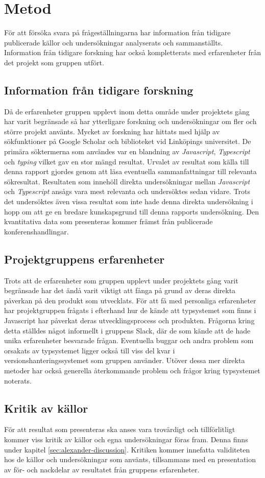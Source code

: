 \section{Metod}
\label{sec:alexander-method}

För att försöka svara på frågeställningarna har information från tidigare publicerade källor och undersökningar analyserats och sammanställts. Information från tidigare forskning har också kompletterats med erfarenheter från det projekt som gruppen utfört. 

\subsection{Information från tidigare forskning}

Då de erfarenheter gruppen upplevt inom detta område under projektets gång har varit begränsade så har ytterligare forskning och undersökningar om fler och större projekt använts. Mycket av forskning har hittats med hjälp av sökfunktioner på Google Scholar och biblioteket vid Linköpings universitet. De primära söktermerna som användes var en blandning av \textit{Javascript}, \textit{Typescript} och \textit{typing} vilket gav en stor mängd resultat. Urvalet av resultat som källa till denna rapport gjordes genom att läsa eventuella sammanfattningar till relevanta sökresultat. Resultaten som innehöll direkta undersökningar mellan \textit{Javascript} och \textit{Typescript} ansågs vara mest relevanta och undersöktes sedan vidare. Trots det undersöktes även vissa resultat som inte hade denna direkta undersökning i hopp om att ge en bredare kunskapsgrund till denna rapports undersökning. Den kvantitativa data som presenteras kommer främst från publicerade konferenshandlingar.

\subsection{Projektgruppens erfarenheter}
Trots att de erfarenheter som gruppen upplevt under projektets gång varit begränsade har det ändå varit viktigt att fånga på grund av deras direkta påverkan på den produkt som utvecklats. För att få med personliga erfarenheter har projektgruppen frågats i efterhand hur de kände att typsystemet som finns i Javascript har påverkat deras utvecklingsprocess och produkten. Frågorna kring detta ställdes något informellt i gruppens Slack, där de som kände att de hade unika erfarenheter besvarade frågan. Eventuella buggar och andra problem som orsakats av typsystemet ligger också till viss del kvar i versionshanteringssystemet som gruppen använder. Utöver dessa mer direkta metoder har också generella återkommande problem och frågor kring typsystemet noterats.

\subsection{Kritik av källor}
För att resultat som presenteras ska anses vara trovärdigt och tillförlitligt kommer viss kritik av källor och egna undersökningar föras fram. Denna finns under kapitel \ref{sec:alexander-discussion}. Kritiken kommer innefatta validiteten hos de källor och undersökningar som använts, tillsammans med en presentation av för- och nackdelar av resultatet från gruppens erfarenheter. 
